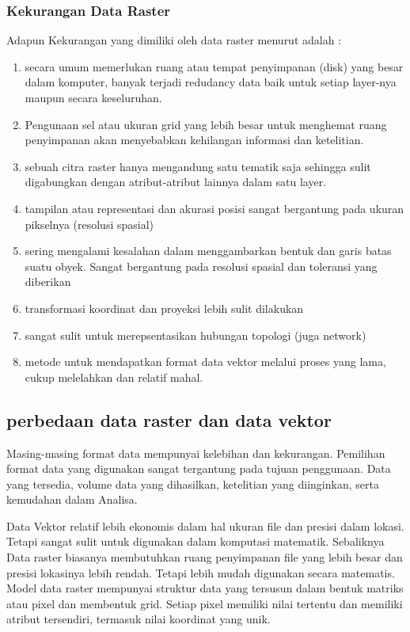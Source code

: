 \subsubsection{Kekurangan Data Raster}
Adapun Kekurangan yang dimiliki oleh data raster menurut \cite{irwansyah2013sistem} adalah :
	\begin{enumerate}
		\item secara umum memerlukan ruang atau tempat penyimpanan (disk) yang besar dalam komputer, banyak terjadi redudancy data baik untuk setiap layer-nya maupun secara keseluruhan.
		\item Pengunaan sel atau ukuran grid yang lebih besar untuk menghemat ruang penyimpanan akan menyebabkan kehilangan informasi dan ketelitian.
		\item sebuah citra raster hanya mengandung satu tematik saja sehingga sulit digabungkan dengan atribut-atribut lainnya dalam satu layer.
		\item tampilan atau representasi dan akurasi posisi sangat bergantung pada ukuran pikselnya (resolusi spasial)
		\item sering mengalami kesalahan dalam menggambarkan bentuk dan garis batas suatu obyek. Sangat bergantung pada resolusi spasial dan toleransi yang diberikan
		\item transformasi koordinat dan proyeksi lebih sulit dilakukan
		\item sangat sulit untuk merepsentasikan hubungan topologi (juga network)
		\item metode untuk mendapatkan format data vektor melalui proses yang lama, cukup melelahkan dan relatif mahal.
	\end{enumerate}

\subsection{perbedaan data raster dan data vektor}
Masing-masing format data mempunyai kelebihan dan kekurangan.
Pemilihan format data yang digunakan sangat tergantung pada tujuan penggunaan. 
Data yang tersedia, volume data yang dihasilkan, ketelitian yang diinginkan, serta kemudahan dalam Analisa.

Data Vektor relatif lebih ekonomis dalam hal ukuran file dan presisi dalam lokasi. Tetapi sangat sulit untuk 
digunakan dalam komputasi matematik.
Sebaliknya Data raster biasanya membutuhkan ruang penyimpanan file yang lebih besar dan presisi lokasinya lebih rendah.
Tetapi lebih mudah digunakan secara matematis.
Model data raster mempunyai struktur data yang tersusun dalam bentuk matriks atau pixel dan membentuk grid. 
Setiap pixel memiliki nilai tertentu dan memiliki atribut tersendiri, termasuk nilai koordinat yang unik.

